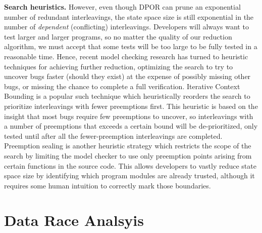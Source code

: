 {\bf Search heuristics.}
However, even though DPOR can prune an exponential number of redundant interleavings, the state space size is still exponential in the number of {\em dependent} (conflicting) interleavings.
Developers will always want to test larger and larger programs, so no matter the quality of our reduction algorithm,
we must accept that some tests will be too large to be fully tested in a reasonable time.
Hence, recent model checking research has turned to heuristic techniques for achieving further reduction,
optimizing the search to try to uncover bugs faster (should they exist)
at the expense of possibly missing other bugs,
or missing the chance to complete a full verification.
Iterative Context Bounding \cite{chess-icb} is a popular such technique which heuristically reorders the search to prioritize interleavings with fewer preemptions first.
This heuristic is based on the insight that most bugs require few preemptions to uncover, so interleavings with a number of preemptions that exceeds a certain bound will be de-prioritized, only tested until after all the fewer-preemption interleavings are completed.
Preemption sealing \cite{sealing} is another heuristic strategy which restricts the scope of the search by limiting the model checker to use only preemption points arising from certain functions in the source code.
This allows developers to vastly reduce state space size by identifying which program modules are already trusted,
although it requires some human intuition to correctly mark those boundaries.


\section{Data Race Analsyis}

